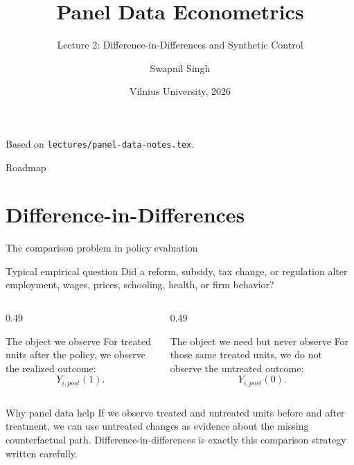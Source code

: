 \documentclass[10pt]{beamer}
\title{Panel Data Econometrics}
\subtitle{Lecture 2: Difference-in-Differences and Synthetic Control}
\author{Swapnil Singh}
\institute{Lietuvos Bankas \and Kaunas University of Technology}
\date{Vilnius University, 2026}
\begin{document}
\begin{frame}[plain]
  \titlepage
  \vfill
  {\scriptsize\color{gray} Based on \texttt{lectures/panel-data-notes.tex}.}
\end{frame}

\begin{frame}{Roadmap}
\tableofcontents
\end{frame}

\section{Difference-in-Differences}

\begin{frame}{The comparison problem in policy evaluation}
\label{slide:did_compare}
\small
\begin{block}{Typical empirical question}
Did a reform, subsidy, tax change, or regulation alter employment, wages, prices, schooling, health, or firm behavior?
\end{block}

\begin{columns}[T]
\begin{column}{0.49\textwidth}
\begin{alertblock}{The object we observe}
For treated units after the policy, we observe the realized outcome:
\[
Y_{i,post}(1).
\]
\end{alertblock}
\end{column}
\begin{column}{0.49\textwidth}
\begin{alertblock}{The object we need but never observe}
For those same treated units, we do not observe the untreated outcome:
\[
Y_{i,post}(0).
\]
\end{alertblock}
\end{column}
\end{columns}

\begin{exampleblock}{Why panel data help}
If we observe treated and untreated units before and after treatment, we can use untreated changes as evidence about the missing counterfactual path. Difference-in-differences is exactly this comparison strategy written carefully.
\end{exampleblock}
\end{frame}
\end{document}
